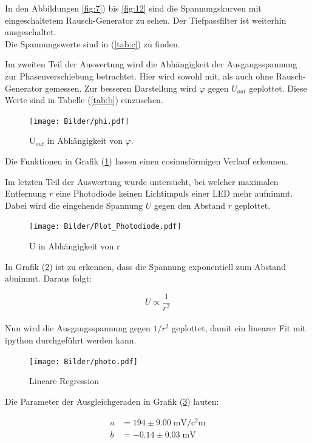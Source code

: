 In den Abbildungen \eqref{fig:7}) bis \eqref{fig:12} sind die Spannungskurven mit
eingeschaltetem Rausch-Generator zu sehen. Der Tiefpassfilter ist weiterhin ausgeschaltet. \\
Die Spannungswerte sind in (\ref{tab:c}) zu finden. \\

\newpage

Im zweiten Teil der Auswertung wird die Abhängigkeit der Ausgangsspannung zur Phasenverschiebung
betrachtet. Hier wird sowohl mit, als auch ohne Rausch-Generator gemessen. Zur besseren
Darstellung wird $\varphi$ gegen $U_{out}$ geplottet. Diese Werte sind in Tabelle (\ref{tab:b}) einzusehen.

\begin{figure}[H]
  \centering
  \texttt{[image: Bilder/phi.pdf]}
  \caption{U$_{out}$ in Abhängigkeit von $\varphi$.}
  \label{fig:Uout}
\end{figure}

Die Funktionen in Grafik (\ref{fig:Uout}) lassen einen cosinusförmigen Verlauf erkennen. \\

\newpage


Im letzten Teil der Auswertung wurde untersucht, bei welcher maximalen Entfernung $r$
eine Photodiode keinen Lichtimpuls einer LED mehr aufnimmt. Dabei wird die eingehende Spannung $U$
gegen den Abstand $r$ geplottet.
\begin{figure}[H]
  \centering
  \texttt{[image: Bilder/Plot\_Photodiode.pdf]}
  \caption{U in Abhängigkeit von r}
  \label{fig:led}
\end{figure}

In Grafik (\ref{fig:led}) ist zu erkennen, dass die Spannung exponentiell zum Abstand
abnimmt. Daraus folgt:

\begin{equation*}
  U \propto \frac{1}{r^2}
\end{equation*}
\\
Nun wird die Ausgangsspannung gegen $1/r^2$ geplottet, damit ein linearer Fit mit ipython durchgeführt
werden kann.

\begin{figure}[!h]
\centering
\texttt{[image: Bilder/photo.pdf]}
\caption{Lineare Regression}
\label{fig:lin}
\end{figure}

Die Parameter der Ausgleichgeraden in Grafik (\ref{fig:lin}) lauten:

\begin{align*}
    a &= 194 ± 9.00 \; \si{\milli\volt\per\square\centi\meter} \\
    b &= -0.14 ± 0.03 \; \si{\milli\volt}
\end{align*}
